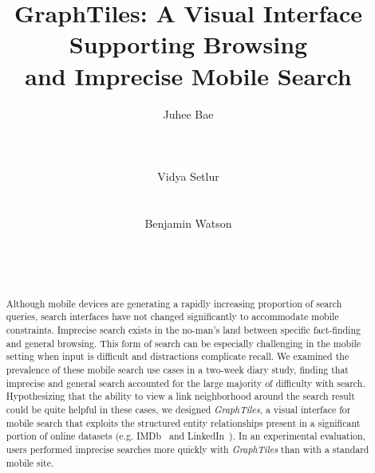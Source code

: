 \documentclass{sigchi}
\begin{document}
\title{GraphTiles: A Visual Interface Supporting Browsing \\and Imprecise Mobile Search}

\author{
  \alignauthor Juhee Bae\\
    \\
     \\
    \\
  \alignauthor Vidya Setlur\\
    \\
    \\ 
  \alignauthor Benjamin Watson\\
    \\
     \\
    \\
}


\maketitle


\begin{abstract}
Although mobile devices are generating a rapidly increasing proportion of search queries, search interfaces have not changed significantly to accommodate mobile constraints. Imprecise search exists in the no-man's land between specific fact-finding and general browsing. This form of search can be especially challenging in the mobile setting when input is difficult and distractions complicate recall. We examined the prevalence of these mobile search use cases in a two-week diary study, finding that imprecise and general search accounted for the large majority of difficulty with search. Hypothesizing that the ability to view a link neighborhood around the search result could be quite helpful in these cases, we designed \textit{GraphTiles}, a visual interface for mobile search that exploits the structured entity relationships present in a significant portion of online datasets (e.g. IMDb~\cite{imdb} and LinkedIn~\cite{linkedin}). In an experimental evaluation, users performed imprecise searches more quickly with \textit{GraphTiles} than with a standard mobile site. 
\end{abstract}
\end{document}
